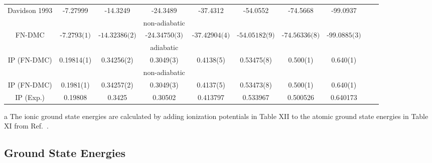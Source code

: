 \documentclass[pra,superscriptaddress,groupedaddress,twocolumn]{revtex4}
\begin{document}
\begin{table}[t!]
\begin{threeparttable}
\begin{tabular*}{\textwidth}{@{\extracolsep{\fill}} cccccccccc}
Davidson 1993\tnote{a} \cite{Davidson_Atoms} & -7.27999 & -14.3249 & -24.3489 & -37.4312 & -54.0552 & -74.5668 & -99.0937 \\
&&&non-adiabatic&&&& \\
FN-DMC & $\text{-7.2793(1)}$ & $\text{-14.32386(2)}$ & $\text{-24.34750(3)}$ & $\text{-37.42904(4)}$ & $\text{-54.05182(9)}$ & $\text{-74.56336(8)}$ & $\text{-99.0885(3)}$ \\
\hline
&&&adiabatic&&&& \\
IP (FN-DMC) & 0.19814(1) & 0.34256(2) & 0.3049(3) & 0.4138(5) & 0.53475(8) & 0.500(1) & 0.640(1) \\
&&&non-adiabatic&&&& \\
IP (FN-DMC) & 0.1981(1) & 0.34257(2) & 0.3049(3) & 0.4137(5) & 0.53473(8) & 0.500(1) & 0.640(1) \\
IP (Exp.) \cite{Davidson_Atoms} & 0.19808 & 0.3425 & 0.30502 & 0.413797 & 0.533967 & 0.500526 & 0.640173 \\
\hline\hline
\end{tabular*}
\begin{tablenotes}
\item[a] The ionic ground state energies are calculated by adding ionization potentials in Table XII to the atomic ground state energies in Table XI from Ref.~\cite{Davidson_Atoms}.
\end{tablenotes}
\end{threeparttable}
\end{table}

\subsection{Ground State Energies}
\end{document}

